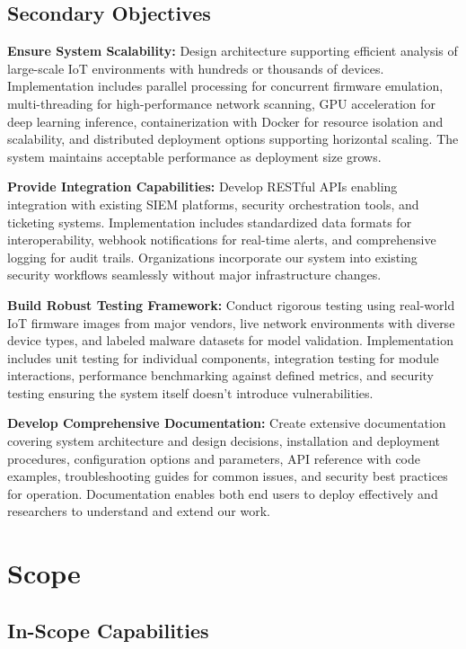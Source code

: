 \subsection{Secondary Objectives}

\textbf{Ensure System Scalability:} Design architecture supporting efficient analysis of large-scale IoT environments with hundreds or thousands of devices. Implementation includes parallel processing for concurrent firmware emulation, multi-threading for high-performance network scanning, GPU acceleration for deep learning inference, containerization with Docker for resource isolation and scalability, and distributed deployment options supporting horizontal scaling. The system maintains acceptable performance as deployment size grows.

\textbf{Provide Integration Capabilities:} Develop RESTful APIs enabling integration with existing SIEM platforms, security orchestration tools, and ticketing systems. Implementation includes standardized data formats for interoperability, webhook notifications for real-time alerts, and comprehensive logging for audit trails. Organizations incorporate our system into existing security workflows seamlessly without major infrastructure changes.

\textbf{Build Robust Testing Framework:} Conduct rigorous testing using real-world IoT firmware images from major vendors, live network environments with diverse device types, and labeled malware datasets for model validation. Implementation includes unit testing for individual components, integration testing for module interactions, performance benchmarking against defined metrics, and security testing ensuring the system itself doesn't introduce vulnerabilities.

\textbf{Develop Comprehensive Documentation:} Create extensive documentation covering system architecture and design decisions, installation and deployment procedures, configuration options and parameters, API reference with code examples, troubleshooting guides for common issues, and security best practices for operation. Documentation enables both end users to deploy effectively and researchers to understand and extend our work.

\section{Scope}

\subsection{In-Scope Capabilities}

